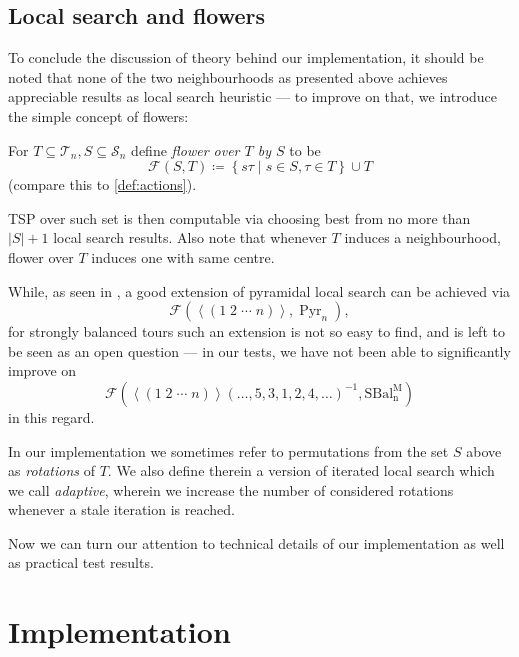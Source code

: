 \documentclass[index=totoc,bibliography=totoc]{scrartcl}
\numberwithin{equation}{section}
\numberwithin{figure}{section}
\numberwithin{table}{section}
\let\defstyle\itshape
\begin{document}
\subsection{Local search and flowers}

To conclude the discussion of theory behind our implementation, it should
be noted that none of the two neighbourhoods as presented above achieves
appreciable results as local search heuristic --- to improve on that, we
introduce the simple concept of flowers:

\begin{define}
  For $T \subseteq \mathcal{T}_n, S \subseteq \mathcal{S}_n$ define
  {\defstyle flower over $T$ by $S$} to be
  \[
    \mathcal{F}\left(S,T\right) \coloneqq
    \left\{ s \tau \mid s \in S, \tau \in T\right\} \cup T
  \]
  (compare this to \cref{def:actions}).
\end{define}

TSP over such set is then computable via choosing best from no
more than $\left|S\right|+1$ local search results.  Also note that whenever
$T$ induces a neighbourhood, flower over $T$ induces one with same centre.

While, as seen in \cite{belperm}, a good extension of pyramidal local
search can be achieved via
\[
  \mathcal{F}\left(
    \left<\left( 1\;2\;\cdots\;n\right)\right>,
    \operatorname{Pyr}_n
  \right),
\]
for strongly balanced tours such an extension is not so easy to find,
and is left to be seen as an open question ---
in our tests, we have not been able to significantly improve on
\[
  \mathcal{F}\left(
  \left<\left( 1\;2\;\cdots\;n\right)\right>
    \left(\ldots , 5, 3, 1, 2, 4, \ldots\right)^{-1},
    \operatorname{SBal_n^M}
  \right)
\]
in this regard.

In our implementation we sometimes refer to permutations from the set $S$ above
as {\defstyle rotations} of $T$.
We also define therein a version of iterated local search which we call
{\defstyle adaptive}, wherein we increase the number of considered rotations
whenever a stale iteration is reached.

Now we can turn our attention to technical details of our implementation
as well as practical test results.


\section{Implementation}
\vspace{0.87em}
\end{document}
